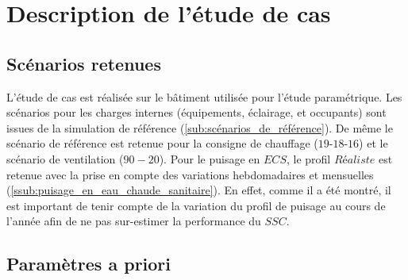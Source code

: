 




\section{Description de l’étude de cas} %
\label{sec:description_de_l_etude_de_cas}
\subsection{Scénarios retenues} %
\label{sub:scenarios_retenues}
L’étude de cas est réalisée sur le bâtiment utilisée pour l’étude paramétrique.
Les scénarios pour les charges internes (équipements, éclairage, et occupants) sont
issues de la simulation de référence (\ref{sub:scénarios_de_référence}). De même
le scénario de référence est retenue pour la consigne de chauffage ($19$-$18$-$16$)
et le scénario de ventilation ($90-20$).
Pour le puisage en $ECS$, le profil $Réaliste$ est retenue avec la prise en compte des
variations hebdomadaires et mensuelles (\ref{ssub:puisage_en_eau_chaude_sanitaire}).
En effet, comme il a été montré, il est important de tenir compte de la variation
du profil de puisage au cours de l’année afin de ne pas sur-estimer la performance
du $SSC$.



\subsection{Paramètres a priori} %
\label{sub:parametres_a_priori}
~


